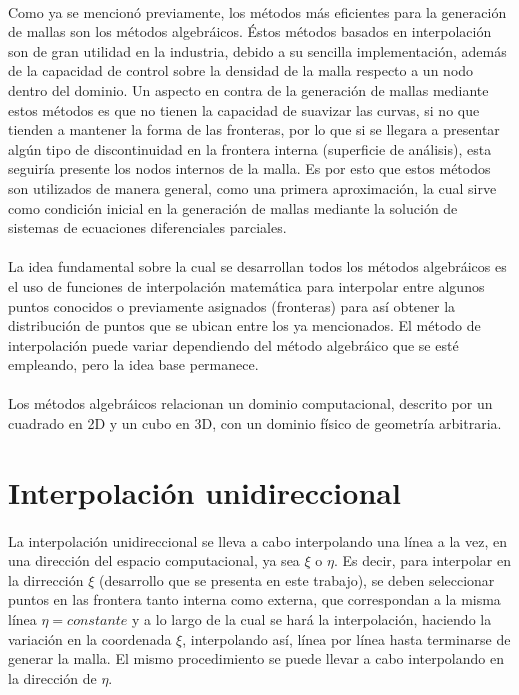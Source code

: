 \documentclass[letterpaper, openright, 12pt]{book}
\begin{document}
	\paragraph*{}
		Como ya se mencionó previamente, los métodos más eficientes para la generación de mallas son los métodos algebráicos. Éstos métodos basados en interpolación son de gran utilidad en la industria, debido a su sencilla implementación, además de la capacidad de control sobre la densidad de la malla respecto a un nodo dentro del dominio. Un aspecto en contra de la generación de mallas mediante estos métodos es que no tienen la capacidad de suavizar las curvas, si no que tienden a mantener la forma de las fronteras, por lo que si se llegara a presentar algún tipo de discontinuidad en la frontera interna (superficie de análisis), esta seguiría presente los nodos internos de la malla. Es por esto que estos métodos son utilizados de manera general, como una primera aproximación, la cual sirve como condición inicial en la generación de mallas mediante la solución de sistemas de ecuaciones diferenciales parciales.\cite{farrashkhalvat}
	\paragraph*{}
		La idea fundamental sobre la cual se desarrollan todos los métodos algebráicos es el uso de funciones de interpolación matemática para interpolar entre algunos puntos conocidos o previamente asignados (fronteras) para así obtener la distribución de puntos que se ubican entre los ya mencionados. El método de interpolación puede variar dependiendo del método algebráico que se esté empleando, pero la idea base permanece. \cite{siladicParabolic}
	\paragraph*{}
		Los métodos algebráicos relacionan un dominio computacional, descrito por un cuadrado en 2D y un cubo en 3D, con un dominio físico de geometría arbitraria.
		
		
	\section{Interpolación unidireccional}
		\paragraph*{}
			La interpolación unidireccional se lleva a cabo interpolando una línea a la vez, en una dirección del espacio computacional, ya sea $\xi$ o $\eta$. Es decir, para interpolar en la dirrección $\xi$ (desarrollo que se presenta en este trabajo), se deben seleccionar puntos en las frontera tanto interna como externa, que correspondan a la misma línea $\eta = constante$ y a lo largo de la cual se hará la interpolación, haciendo la variación en la coordenada $\xi$, interpolando así, línea por línea hasta terminarse de generar la malla. El mismo procedimiento se puede llevar a cabo interpolando en la dirección de $\eta$.
\end{document}
